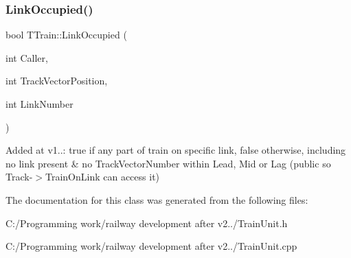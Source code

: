 \subsubsection{\texorpdfstring{Link\+Occupied()}{LinkOccupied()}}
{\footnotesize\ttfamily bool T\+Train\+::\+Link\+Occupied (\begin{DoxyParamCaption}\item[{int}]{Caller,  }\item[{int}]{Track\+Vector\+Position,  }\item[{int}]{Link\+Number }\end{DoxyParamCaption})}

Added at v1..\+: true if any part of train on specific link, false otherwise, including no link present \& no Track\+Vector\+Number within Lead, Mid or Lag (public so Track-\/$>$Train\+On\+Link can access it) 

The documentation for this class was generated from the following files\+:\begin{DoxyCompactItemize}
\item 
C\+:/\+Programming work/railway development after v2../Train\+Unit.\+h\item 
C\+:/\+Programming work/railway development after v2../Train\+Unit.\+cpp\end{DoxyCompactItemize}
